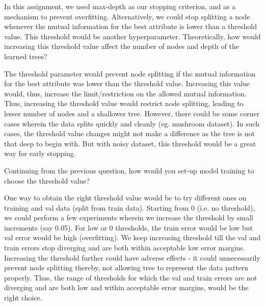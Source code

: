 \documentclass[11pt,addpoints,answers]{exam}
\begin{document}
\begin{questions}
\question[3] In this assignment, we used max-depth as our stopping criterion, and as a mechanism to prevent overfitting. Alternatively, we could stop splitting a node whenever the mutual information for the best attribute is lower than a threshold value. This threshold would be another hyperparameter. Theoretically, how would increasing this threshold value affect the number of nodes and depth of the learned trees?
    
    \begin{your_solution}[title=Answer,height=5cm,width=15cm]
        The threshold parameter would prevent node splitting if the mutual information for the best attribute was lower than the threshold value. Increasing this value would, thus, increase the limit/restriction on the allowed mutual information. Thus, increasing the threshold value would restrict node splitting, leading to lesser number of nodes and a shallower tree.
However, there could be some corner cases wherein the data splits quickly and cleanly (eg. mushroom dataset). In such cases, the threshold value changes might not make a difference as the tree is not that deep to begin with. But with noisy dataset, this threshold would be a great way for early stopping.
    \end{your_solution}


    \clearpage
    \question[3] Continuing from the previous question, how would you set-up model training to choose the threshold value?
    

    \begin{your_solution}[title=Answer,height=5cm,width=15cm]
        One way to obtain the right threshold value would be to try different ones on training and val data (split from train data). Starting from 0 (i.e. no threshold), we could perform a few experiments wherein we increase the threshold by small increments (say 0.05). For low or 0 thresholds, the train error would be low but val error would be high (overfitting). We keep increasing threshold till the val and train errors stop diverging and are both within acceptable low error margins.
Increasing the threshold further could have adverse effects - it could unnecessarily prevent node splitting thereby, not allowing tree to represent the data pattern properly.
Thus, the range of thresholds for which the val and train errors are not diverging and are both low and within acceptable error margins, would be the right choice.
    \end{your_solution}
    

\end{questions}
\end{document}
